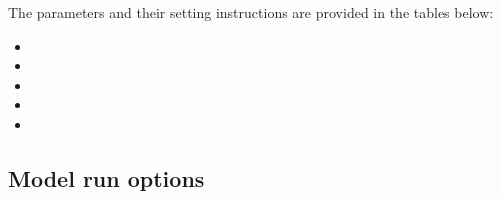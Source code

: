 \documentclass[letterpaper,10pt,english]{sphinxmanual}
\begin{document}
The parameters and their setting instructions are provided in the tables below:
\begin{itemize}
\item {} 

\item {} 

\item {} 

\item {} 

\item {} 

\end{itemize}


\subsection{Model run options}
\label{\detokenize{input_files/RunControl/Model_run_options:model-run-options}}\label{\detokenize{input_files/RunControl/Model_run_options::doc}}
\end{document}
